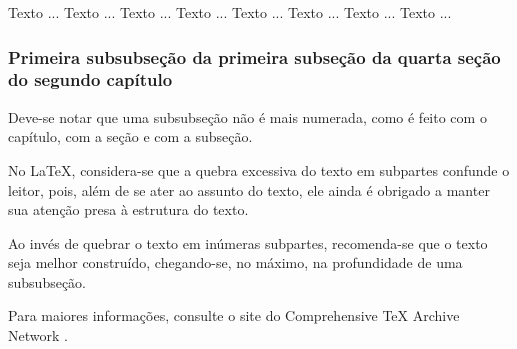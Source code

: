 Texto ... Texto ...
Texto ... Texto ...
Texto ... Texto ...
Texto ... Texto ...

\subsubsection{Primeira subsubseção da primeira subseção 
               da quarta seção do segundo capítulo}

Deve-se notar que uma subsubseção não é mais numerada,
como é feito com o capítulo, com a seção e com a subseção.

No \LaTeX, 
considera-se que a quebra excessiva do texto em subpartes 
confunde o leitor,
pois, além de se ater ao assunto do texto, 
ele ainda é obrigado a manter sua atenção presa à estrutura do texto. 

Ao invés de quebrar o texto em inúmeras subpartes,
recomenda-se que o texto seja melhor construído,
chegando-se, no máximo, na profundidade de uma subsubseção.

Para maiores informações, consulte o site do Comprehensive TeX Archive Network \cite{ctan}.

